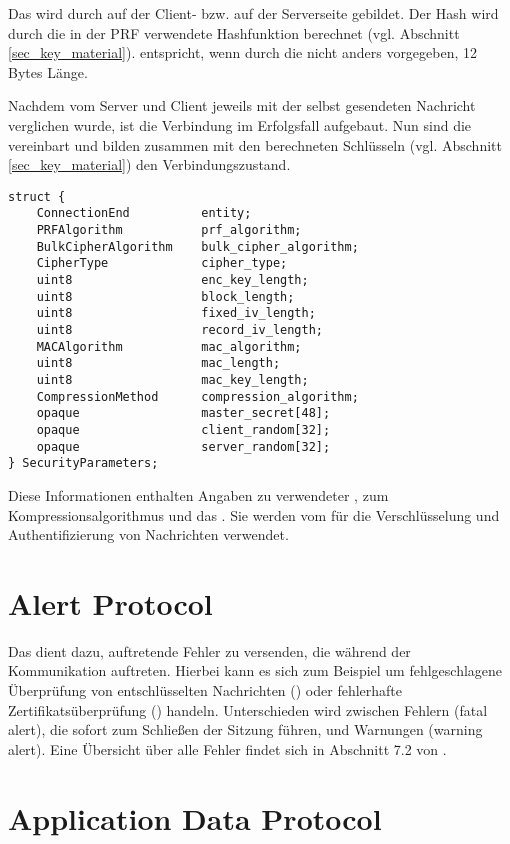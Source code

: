 Das  wird durch  auf der Client- bzw.  auf der Serverseite gebildet. Der Hash wird durch die in der PRF verwendete Hashfunktion berechnet (vgl. Abschnitt \ref{sec_key_material}).   entspricht, wenn durch die \ciphersuite{} nicht anders vorgegeben, 12 Bytes Länge.

Nachdem  vom Server und Client jeweils mit der selbst gesendeten Nachricht verglichen wurde, ist die Verbindung im Erfolgsfall aufgebaut. Nun sind die  vereinbart und bilden zusammen mit den berechneten Schlüsseln (vgl. Abschnitt \ref{sec_key_material}) den Verbindungszustand. 
\begin{lstlisting}
struct {
	ConnectionEnd          entity;
	PRFAlgorithm           prf_algorithm;
	BulkCipherAlgorithm    bulk_cipher_algorithm;
	CipherType             cipher_type;
	uint8                  enc_key_length;
	uint8                  block_length;
	uint8                  fixed_iv_length;
	uint8                  record_iv_length;
	MACAlgorithm           mac_algorithm;
	uint8                  mac_length;
	uint8                  mac_key_length;
	CompressionMethod      compression_algorithm;
	opaque                 master_secret[48];
	opaque                 client_random[32];
	opaque                 server_random[32];
} SecurityParameters;
\end{lstlisting}
Diese Informationen enthalten Angaben zu verwendeter \ciphersuite{}, zum Kompressionsalgorithmus und das \mastersecret{}. Sie werden vom \recordprotocol{} für die Verschlüsselung und Authentifizierung von Nachrichten verwendet.

\section{Alert Protocol}

Das \alertprotocol{} dient dazu, auftretende Fehler zu versenden, die während der Kommunikation auftreten. Hierbei kann es sich zum Beispiel um fehlgeschlagene Überprüfung von entschlüsselten Nachrichten (\badrecordmac{}) oder fehlerhafte Zertifikatsüberprüfung (\badcertificate{}) handeln. Unterschieden wird zwischen Fehlern (fatal alert), die sofort zum Schließen der Sitzung führen, und Warnungen (warning alert). Eine Übersicht über alle Fehler findet sich in Abschnitt 7.2 von \cite{tls12}.

\section{Application Data Protocol}

